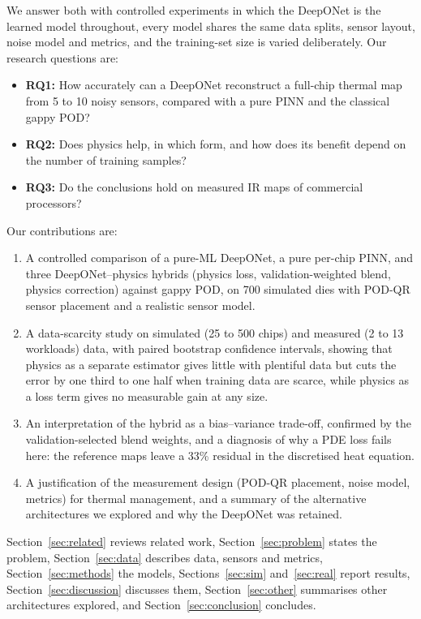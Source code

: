\documentclass[journal]{IEEEtran}
\begin{document}
We answer both with controlled experiments in which the DeepONet is the learned model throughout, every model shares the same data splits, sensor layout, noise model and metrics, and the training-set size is varied deliberately.
Our research questions are:
\begin{itemize}
\item \textbf{RQ1:} How accurately can a DeepONet reconstruct a full-chip thermal map from 5 to 10 noisy sensors, compared with a pure PINN and the classical gappy POD?
\item \textbf{RQ2:} Does physics help, in which form, and how does its benefit depend on the number of training samples?
\item \textbf{RQ3:} Do the conclusions hold on measured IR maps of commercial processors?
\end{itemize}

Our contributions are:
\begin{enumerate}
\item A controlled comparison of a pure-ML DeepONet, a pure per-chip PINN, and three DeepONet--physics hybrids (physics loss, validation-weighted blend, physics correction) against gappy POD, on 700 simulated dies with POD-QR sensor placement and a realistic sensor model.
\item A data-scarcity study on simulated (25 to 500 chips) and measured (2 to 13 workloads) data, with paired bootstrap confidence intervals, showing that physics as a separate estimator gives little with plentiful data but cuts the error by one third to one half when training data are scarce, while physics as a loss term gives no measurable gain at any size.
\item An interpretation of the hybrid as a bias--variance trade-off, confirmed by the validation-selected blend weights, and a diagnosis of why a PDE loss fails here: the reference maps leave a 33\% residual in the discretised heat equation.
\item A justification of the measurement design (POD-QR placement, noise model, metrics) for thermal management, and a summary of the alternative architectures we explored and why the DeepONet was retained.
\end{enumerate}

Section~\ref{sec:related} reviews related work, Section~\ref{sec:problem} states the problem, Section~\ref{sec:data} describes data, sensors and metrics, Section~\ref{sec:methods} the models, Sections~\ref{sec:sim} and~\ref{sec:real} report results, Section~\ref{sec:discussion} discusses them, Section~\ref{sec:other} summarises other architectures explored, and Section~\ref{sec:conclusion} concludes.
\end{document}
